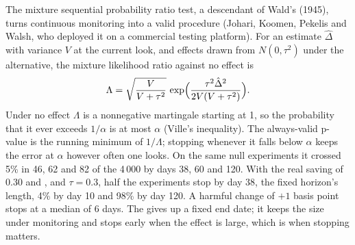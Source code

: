 The mixture sequential probability ratio test, a descendant of Wald's  (1945), turns continuous monitoring into a valid procedure (Johari,
Koomen, Pekelis and Walsh, who deployed it on a commercial testing platform). For an estimate $\hat\Delta$ with variance $V$ at the current look, and effects
drawn from $N(0, \tau^2)$ under the alternative, the mixture likelihood ratio against no effect is
\[
\Lambda = \sqrt{\frac{V}{V+\tau^2}}\,\exp\Bigl(\frac{\tau^2\hat\Delta^2}{2V(V+\tau^2)}\Bigr).
\]
Under no effect $\Lambda$ is a nonnegative martingale starting at 1, so the probability that it ever exceeds $1/\alpha$ is at most $\alpha$ (Ville's
inequality). The always-valid p-value is the running minimum of $1/\Lambda$; stopping whenever it falls below $\alpha$ keeps the error at $\alpha$ however often
one looks. On the same null experiments it crossed 5\% in 46, 62 and 82 of the 4\,000 by days 38, 60 and 120. With the real saving of 0.30 and , and
$\tau = 0.3$, half the experiments stop by day 38, the fixed horizon's length, 4\% by day 10 and 98\% by day 120. A harmful change of $+1$ basis point stops at
a median of 6 days. The  gives up a fixed end date; it keeps the size under monitoring and stops early when the effect is large, which is when
stopping matters.

